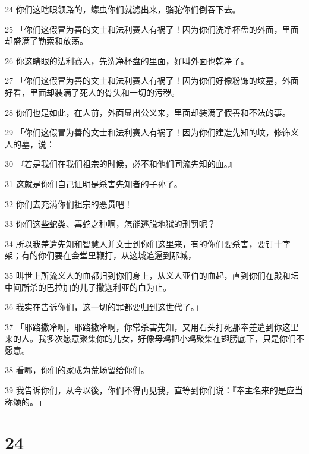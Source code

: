 \par 24 你们这瞎眼领路的，蠓虫你们就滤出来，骆驼你们倒吞下去。
\par 25 「你们这假冒为善的文士和法利赛人有祸了！因为你们洗净杯盘的外面，里面却盛满了勒索和放荡。
\par 26 你这瞎眼的法利赛人，先洗净杯盘的里面，好叫外面也乾净了。
\par 27 「你们这假冒为善的文士和法利赛人有祸了！因为你们好像粉饰的坟墓，外面好看，里面却装满了死人的骨头和一切的污秽。
\par 28 你们也是如此，在人前，外面显出公义来，里面却装满了假善和不法的事。
\par 29 「你们这假冒为善的文士和法利赛人有祸了！因为你们建造先知的坟，修饰义人的墓，说：
\par 30 『若是我们在我们祖宗的时候，必不和他们同流先知的血。』
\par 31 这就是你们自己证明是杀害先知者的子孙了。
\par 32 你们去充满你们祖宗的恶贯吧！
\par 33 你们这些蛇类、毒蛇之种啊，怎能逃脱地狱的刑罚呢？
\par 34 所以我差遣先知和智慧人并文士到你们这里来，有的你们要杀害，要钉十字架；有的你们要在会堂里鞭打，从这城追逼到那城，
\par 35 叫世上所流义人的血都归到你们身上，从义人亚伯的血起，直到你们在殿和坛中间所杀的巴拉加的儿子撒迦利亚的血为止。
\par 36 我实在告诉你们，这一切的罪都要归到这世代了。」
\par 37 「耶路撒冷啊，耶路撒冷啊，你常杀害先知，又用石头打死那奉差遣到你这里来的人。我多次愿意聚集你的儿女，好像母鸡把小鸡聚集在翅膀底下，只是你们不愿意。
\par 38 看哪，你们的家成为荒场留给你们。
\par 39 我告诉你们，从今以後，你们不得再见我，直等到你们说：『奉主名来的是应当称颂的。』」

\chapter{24}

